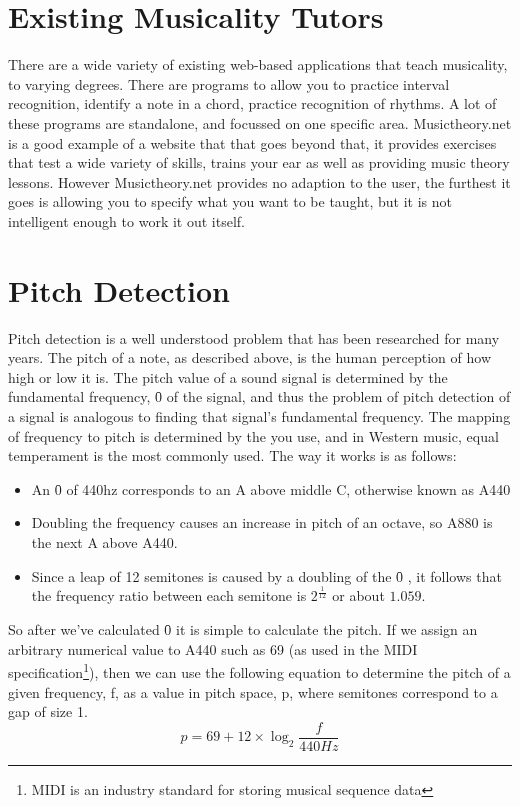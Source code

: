 	\section{Existing Musicality Tutors}
	
	There are a wide variety of existing web-based applications that teach musicality, to varying degrees. There are programs to allow you to practice interval recognition\cite{intervalEarTrainer}, identify a note in a chord, practice recognition of rhythms\cite{rhythmTrainer}. A lot of these programs are standalone, and focussed on one specific area. Musictheory.net\cite{musicTheorynet} is a good example of a website that that goes beyond that, it provides exercises that test a wide variety of skills, trains your ear as well as providing music theory lessons. However Musictheory.net provides no adaption to the user, the furthest it goes is allowing you to specify what you want to be taught, but it is not intelligent enough to work it out itself.
	\section{Pitch Detection}
	\par
	Pitch detection is a well understood problem that has been researched for many years. The pitch of a note, as described above, is the human perception of how high or low it is. The pitch value of a sound signal is determined by the fundamental frequency, \f0 of the signal, and thus the problem of pitch detection of a signal is analogous to finding that signal's fundamental frequency. 
	The mapping of frequency to pitch is determined by the  you use, and in  Western music, equal temperament is the most commonly used. The way it works is as follows:
	\begin{itemize}
		\item An \f0 of 440hz corresponds to an A above middle C, otherwise known as A440
		\item Doubling the frequency causes an increase in pitch of an octave, so A880 is the  next A above A440.
		\item Since a leap of 12 semitones is caused by a doubling of the \f0 , it follows that the frequency ratio between each semitone is \(2^\frac{1}{12}\) or about \(1.059\).
	\end{itemize}
	So after we've calculated \f0 it is simple to calculate the pitch. If we assign an arbitrary numerical value to A440 such as 69 (as used in the MIDI specification\footnote{MIDI is an industry standard for storing musical sequence data}), then we can use the following equation to determine the pitch of a given frequency, f, as a value in pitch space, p, where semitones correspond to a gap of size 1.
	\[p=69+12\times \log_2 \frac{f}{440Hz}\]
	\par
	
